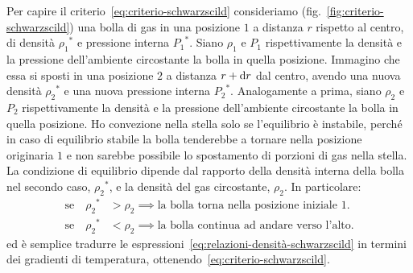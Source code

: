 Per capire il criterio~\eqref{eq:criterio-schwarzscild} consideriamo (fig.~\ref{fig:criterio-schwarzscild}) una bolla di gas in una posizione $1$ a distanza $r$ rispetto al centro, di densità ${\rho_1}^*$ e pressione interna ${P_1}^*$. Siano $\rho_1$ e $P_1$ rispettivamente la densità e la pressione dell'ambiente circostante la bolla in quella posizione. Immagino che essa si sposti in una posizione $2$ a distanza $r + \mathop{\mathrm{{}d}}\mathopen{} r$ dal centro, avendo una nuova densità ${\rho_2}^*$ e una nuova pressione interna ${P_2}^*$. Analogamente a prima, siano $\rho_2$ e $P_2$ rispettivamente la densità e la pressione dell'ambiente circostante la bolla in quella posizione. Ho convezione nella stella solo se l'equilibrio è instabile, perché in caso di equilibrio stabile la bolla tenderebbe a tornare nella posizione originaria $1$ e non sarebbe possibile lo spostamento di porzioni di gas nella stella. La condizione di equilibrio dipende dal rapporto della densità interna della bolla nel secondo caso, ${\rho_2}^*$, e la densità del gas circostante, $\rho_2$. In particolare:
\begin{subequations}
\label{eq:relazioni-densità-schwarzscild}
\begin{align}
  \text{se} \quad {\rho_2}^* &> \rho_2 \implies \text{la bolla torna nella posizione iniziale $1$.} \\
  \text{se} \quad {\rho_2}^* &< \rho_2 \implies \text{la bolla continua ad andare verso l'alto.} 
\end{align}
\end{subequations}
ed è semplice tradurre le espressioni~\eqref{eq:relazioni-densità-schwarzscild} in termini dei gradienti di temperatura, ottenendo~\eqref{eq:criterio-schwarzscild}.

